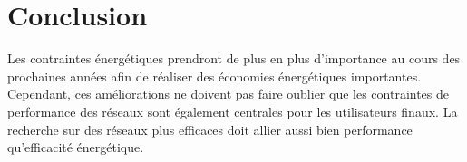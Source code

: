 \section*{Conclusion}

Les contraintes énergétiques prendront de plus en plus d'importance au cours
des prochaines années afin de réaliser des économies énergétiques importantes.
Cependant, ces améliorations ne doivent pas faire oublier que les contraintes
de performance des réseaux sont également centrales pour les utilisateurs
finaux. La recherche sur des réseaux plus efficaces doit allier aussi bien
performance qu'efficacité énergétique.
